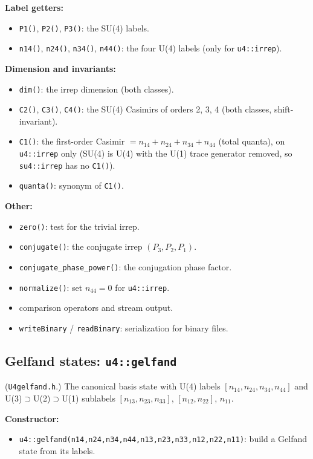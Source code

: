 \documentclass[aps,onecolumn,10pt,superscriptaddress,floatfix,nofootinbib]{revtex4}
\begin{document}
\textbf{Label getters:}
\begin{itemize}
    \item \verb|P1()|, \verb|P2()|, \verb|P3()|: the SU(4) labels.
    \item \verb|n14()|, \verb|n24()|, \verb|n34()|, \verb|n44()|: the four U(4) labels (only for \verb|u4::irrep|).
\end{itemize}

\textbf{Dimension and invariants:}
\begin{itemize}
    \item \verb|dim()|: the irrep dimension (both classes).
    \item \verb|C2()|, \verb|C3()|, \verb|C4()|: the SU(4) Casimirs of orders 2, 3, 4 (both classes, shift-invariant).
    \item \verb|C1()|: the first-order Casimir $=n_{14}{+}n_{24}{+}n_{34}{+}n_{44}$ (total quanta), on \verb|u4::irrep| only (SU(4) is U(4) with the U(1) trace generator removed, so \verb|su4::irrep| has no \verb|C1()|).
    \item \verb|quanta()|: synonym of \verb|C1()|.
\end{itemize}

\textbf{Other:}
\begin{itemize}
    \item \verb|zero()|: test for the trivial irrep.
    \item \verb|conjugate()|: the conjugate irrep $(P_3,P_2,P_1)$.
    \item \verb|conjugate_phase_power()|: the conjugation phase factor.
    \item \verb|normalize()|: set $n_{44}=0$ for \verb|u4::irrep|.
    \item comparison operators and stream output.
    \item \verb|writeBinary| / \verb|readBinary|: serialization for binary files.
\end{itemize}

\subsection{Gelfand states: \texttt{u4::gelfand}}
(\verb|U4gelfand.h|.) The canonical basis state with U(4) labels
$[n_{14},n_{24},n_{34},n_{44}]$ and U(3)$\supset$U(2)$\supset$U(1) sublabels
$[n_{13},n_{23},n_{33}]$, $[n_{12},n_{22}]$, $n_{11}$.

\textbf{Constructor:}
\begin{itemize}
    \item \verb|u4::gelfand(n14,n24,n34,n44,n13,n23,n33,n12,n22,n11)|: build a Gelfand state from its labels.
\end{itemize}
\end{document}

